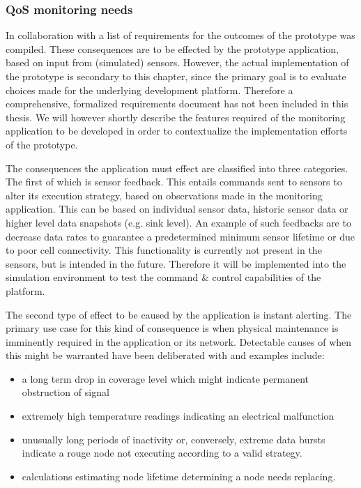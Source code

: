 \subsubsection{QoS monitoring needs}
In collaboration with \idsystems a list of requirements for the outcomes of the prototype was compiled. These consequences are to be effected by the prototype application, based on input from (simulated) sensors. However, the actual implementation of the prototype is secondary to this chapter, since the primary goal is to evaluate choices made for the underlying development platform. Therefore a comprehensive, formalized requirements document has not been included in this thesis. We will however shortly describe the features required of the monitoring application to be developed in order to contextualize the implementation efforts of the prototype.

The consequences the application must effect are classified into three categories. The first of which is sensor feedback. This entails commands sent to sensors to alter its execution strategy, based on observations made in the monitoring application. This can be based on individual sensor data, historic sensor data or higher level data snapshots (e.g. sink level). An example of such feedbacks are to decrease data rates to guarantee a predetermined minimum sensor lifetime or due to poor cell connectivity. This functionality is currently not present in the \nedap sensors, but is intended in the future. Therefore it will be implemented into the simulation environment to test the command \& control capabilities of the platform.

The second type of effect to be caused by the application is instant alerting. The primary use case for this kind of consequence is when physical maintenance is imminently required in the application or its network. Detectable causes of when this might be warranted have been deliberated with \idsystems and examples include:
\begin{itemize}
\nospace
\item a long term drop in coverage level which might indicate permanent obstruction of signal
\item extremely high temperature readings indicating an electrical malfunction
\item unusually long periods of inactivity or, conversely, extreme data bursts indicate a rouge node not executing according to a valid strategy.
\item calculations estimating node lifetime determining a node needs replacing.
\end{itemize}

